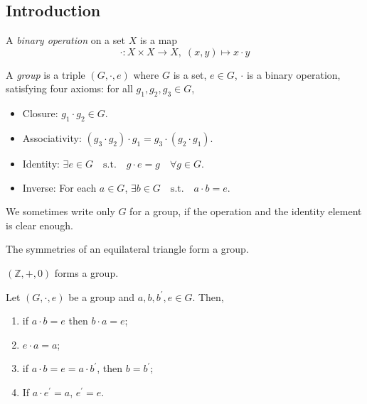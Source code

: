 \documentclass[10pt, a4paper, twoside]{report}
\begin{document}
\subsection{Introduction}
\begin{definition}
    A \emph{binary operation} on a set \(X\) is a map \[\cdot:X\times X\to X,\;(x,y)\mapsto x\cdot y\]
\end{definition}
\begin{definition}
    A \emph{group} is a triple \((G,\cdot,e)\) where \(G\) is a set, \(e\in G\), \(\cdot\) is a binary operation, satisfying four axioms: for all \(g_1,g_2,g_3\in G\), 
    \begin{itemize}
        \item Closure: \(g_1\cdot g_2\in G\).
        \item Associativity: \((g_3\cdot g_2)\cdot g_1=g_3\cdot (g_2\cdot g_1)\).
        \item Identity: \(\exists e\in G\quad\text{s.t.}\quad g\cdot e=g\quad\forall g\in G\).
        \item Inverse: For each \(a\in G\), \(\exists b\in G\quad\text{s.t.}\quad a\cdot b=e\).
      \end{itemize}
\end{definition}
We sometimes write only \(G\) for a group, if the operation and the identity element is clear enough.
\begin{example}
    The symmetries of an equilateral triangle form a group.
\end{example}
\begin{example}
    \((\mathbb{Z},+,0)\) forms a group.
\end{example}
\begin{proposition}
    Let \((G,\cdot,e)\) be a group and \(a,b,b^\prime,e\in G\). Then,
    \begin{enumerate}
        \item if \(a\cdot b=e\) then \(b\cdot a=e\);
        \item \(e\cdot a=a\);
        \item if \(a\cdot b=e=a\cdot b^\prime\), then \(b=b^\prime\);
        \item If \(a\cdot e^\prime=a\), \(e^\prime=e\).
    \end{enumerate}
    \label{prop:elem_group}
\end{proposition}
\end{document}
